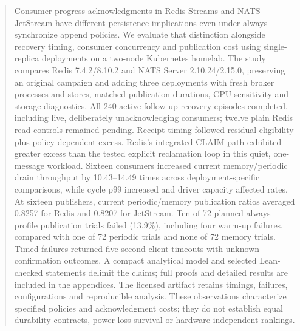 \begin{abstract}
Consumer-progress acknowledgments in Redis Streams and NATS JetStream have different persistence implications even under always-synchronize append policies. We evaluate that distinction alongside recovery timing, consumer concurrency and publication cost using single-replica deployments on a two-node Kubernetes homelab. The study compares Redis 7.4.2/8.10.2 and NATS Server 2.10.24/2.15.0, preserving an original campaign and adding three deployments with fresh broker processes and stores, matched publication durations, CPU sensitivity and storage diagnostics. All 240 active follow-up recovery episodes completed, including live, deliberately unacknowledging consumers; twelve plain Redis read controls remained pending. Receipt timing followed residual eligibility plus policy-dependent excess. Redis's integrated CLAIM path exhibited greater excess than the tested explicit reclamation loop in this quiet, one-message workload. Sixteen consumers increased current memory/periodic drain throughput by 10.43--14.49 times across deployment-specific comparisons, while cycle p99 increased and driver capacity affected rates. At sixteen publishers, current periodic/memory publication ratios averaged 0.8257 for Redis and 0.8207 for JetStream. Ten of 72 planned always-profile publication trials failed (13.9\%), including four warm-up failures, compared with one of 72 periodic trials and none of 72 memory trials. Timed failures returned five-second client timeouts with unknown confirmation outcomes. A compact analytical model and selected Lean-checked statements delimit the claims; full proofs and detailed results are included in the appendices. The licensed artifact retains timings, failures, configurations and reproducible analysis. These observations characterize specified policies and acknowledgment costs; they do not establish equal durability contracts, power-loss survival or hardware-independent rankings.
\end{abstract}
